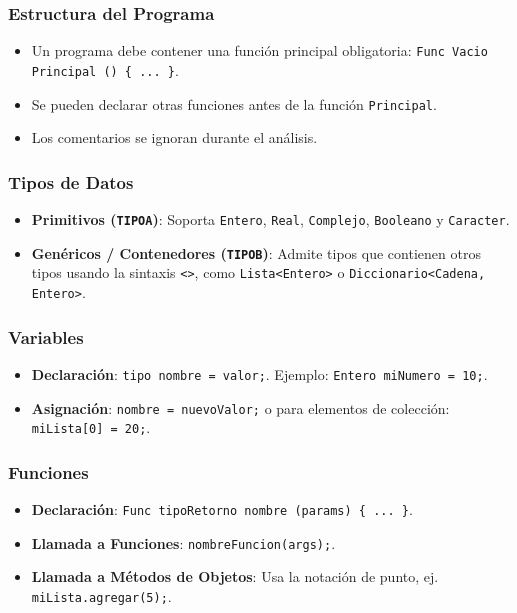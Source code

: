 \documentclass{article}
\begin{document}
\subsubsection{Estructura del Programa}
\begin{itemize}
    \item Un programa debe contener una función principal obligatoria: \texttt{Func Vacio Principal () \{ ... \}}.
    \item Se pueden declarar otras funciones antes de la función \texttt{Principal}.
    \item Los comentarios se ignoran durante el análisis.
\end{itemize}

\subsubsection{Tipos de Datos}
\begin{itemize}
    \item \textbf{Primitivos (\texttt{TIPOA})}: Soporta \texttt{Entero}, \texttt{Real}, \texttt{Complejo}, \texttt{Booleano} y \texttt{Caracter}.
    \item \textbf{Genéricos / Contenedores (\texttt{TIPOB})}: Admite tipos que contienen otros tipos usando la sintaxis \texttt{<>}, como \texttt{Lista<Entero>} o \texttt{Diccionario<Cadena, Entero>}.
\end{itemize}

\subsubsection{Variables}
\begin{itemize}
    \item \textbf{Declaración}: \texttt{tipo nombre = valor;}. Ejemplo: \texttt{Entero miNumero = 10;}.
    \item \textbf{Asignación}: \texttt{nombre = nuevoValor;} o para elementos de colección: \texttt{miLista[0] = 20;}.
\end{itemize}

\subsubsection{Funciones}
\begin{itemize}
    \item \textbf{Declaración}: \texttt{Func tipoRetorno nombre (params) \{ ... \}}.
    \item \textbf{Llamada a Funciones}: \texttt{nombreFuncion(args);}.
    \item \textbf{Llamada a Métodos de Objetos}: Usa la notación de punto, ej. \texttt{miLista.agregar(5);}.
\end{itemize}
\end{document}
